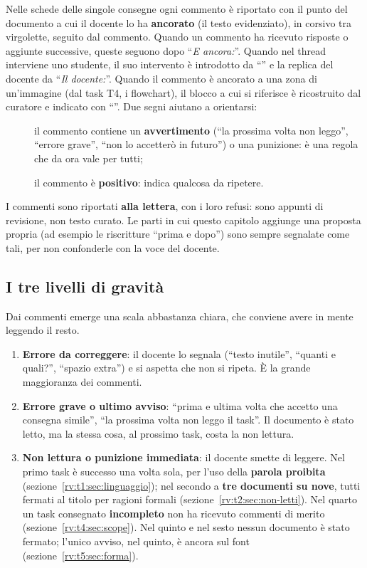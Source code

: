 Nelle schede delle singole consegne ogni commento è riportato con il punto del
documento a cui il docente lo ha \textbf{ancorato} (il testo evidenziato), in
corsivo tra virgolette, seguito dal commento. Quando un commento ha ricevuto
risposte o aggiunte successive, queste seguono dopo ``\emph{E ancora:}''.
Quando nel thread interviene uno studente, il suo intervento è introdotto da
``'' e la replica del docente da ``\emph{Il docente:}''.
Quando il commento è ancorato a una zona di un'immagine (dal task T4, i
flowchart), il blocco a cui si riferisce è ricostruito dal curatore e indicato
con ``''. Due segni aiutano a orientarsi:
\begin{description}
  \item[\rvAvviso] il commento contiene un \textbf{avvertimento} (``la
        prossima volta non leggo'', ``errore grave'', ``non lo accetterò in
        futuro'') o una punizione: è una regola che da ora vale per tutti;
  \item[\rvBene] il commento è \textbf{positivo}: indica qualcosa da
        ripetere.
\end{description}
I commenti sono riportati \textbf{alla lettera}, con i loro refusi: sono
appunti di revisione, non testo curato. Le parti in cui questo capitolo
aggiunge una proposta propria (ad esempio le riscritture ``prima e dopo'')
sono sempre segnalate come tali, per non confonderle con la voce del docente.

\subsection{I tre livelli di gravità}

Dai commenti emerge una scala abbastanza chiara, che conviene avere in mente
leggendo il resto.
\begin{enumerate}
  \item \textbf{Errore da correggere}: il docente lo segnala (``testo
        inutile'', ``quanti e quali?'', ``spazio extra'') e si aspetta che non
        si ripeta. È la grande maggioranza dei commenti.
  \item \textbf{Errore grave o ultimo avviso}: ``prima e ultima volta che
        accetto una consegna simile'', ``la prossima volta non leggo il
        task''. Il documento è stato letto, ma la stessa cosa, al prossimo
        task, costa la non lettura.
  \item \textbf{Non lettura o punizione immediata}: il docente smette di
        leggere. Nel primo task è successo una volta sola, per l'uso della
        \textbf{parola proibita} (sezione~\ref{rv:t1:sec:linguaggio}); nel
        secondo a \textbf{tre documenti su nove}, tutti fermati al titolo per
        ragioni formali (sezione~\ref{rv:t2:sec:non-letti}). Nel quarto un
        task consegnato \textbf{incompleto} non ha ricevuto commenti di
        merito (sezione~\ref{rv:t4:sec:scope}). Nel quinto e nel sesto
        nessun documento è stato fermato; l'unico avviso, nel quinto, è
        ancora sul font (sezione~\ref{rv:t5:sec:forma}).
\end{enumerate}

